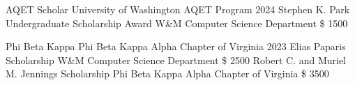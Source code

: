
\begin{cvhonors}
\cvhonor
{AQET Scholar}
{University of Washington AQET Program}
{}
{2024}
\cvhonor
{Stephen K. Park Undergraduate Scholarship Award}
{W\&M Computer Science Department}
{\$ 1500}
{}

\end{cvhonors}
\begin{cvhonors}
\cvhonor
{Phi Beta Kappa}
{Phi Beta Kappa Alpha Chapter of Virginia}
{}
{2023}
\cvhonor
{Elias Paparis Scholarship}
{W\&M Computer Science Department}
{\$ 2500}
{}
\cvhonor
{Robert C. and Muriel M. Jennings Scholarship}
{Phi Beta Kappa Alpha Chapter of Virginia}
{\$ 3500}
{}

\end{cvhonors}
